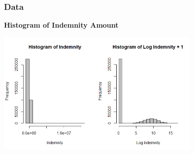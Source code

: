 \documentclass[serif,10pt,aspectratio=169]{beamer}
\begin{document}
\begin{frame}
\frametitle{Data}
\textbf{Histogram of Indemnity Amount}
\begin{center}\includegraphics[width=10cm]{YumaImages/HistogramIndemnityAndLogIndemnity.png}\end{center}
\end{frame}
\end{document}
